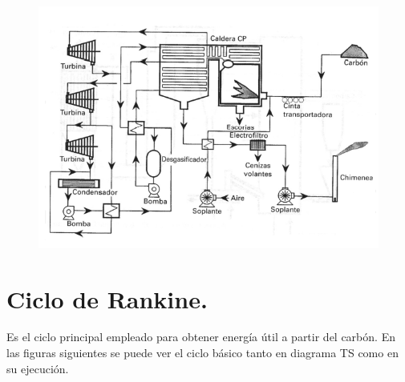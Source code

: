 \begin{figure}[H]
	\centering
	\includegraphics[width=0.7\linewidth]{res/tema10/awaVapor}
	\label{fig:colectormixto}
\end{figure}

\section{Ciclo de Rankine.}
Es el ciclo principal empleado para obtener energía útil a partir del carbón. En las figuras siguientes se puede ver el ciclo básico tanto en diagrama TS como en su ejecución.


